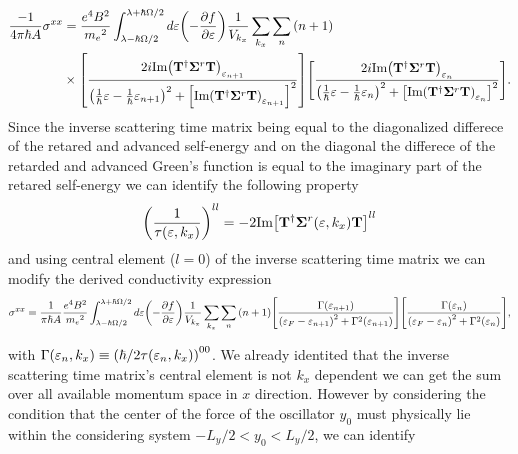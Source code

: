 \begin{widetext}
\begin{equation}
  \begin{aligned}
    \frac{-1}{4\pi\hbar A}
    {\sigma}^{xx} & =
    \frac{e^4B^2}{{{m_e}^2}}
    \int_{\lambda-\hbar\Omega/2}^{\lambda+ \hbar\Omega/2} d\varepsilon
    \qty(
    -\frac{\partial f}{\partial \varepsilon})
    \frac{1}{V_{k_x}} \sum_{k_x} \sum_{n}
    \qty(n+1)
    \\
    & \times
    \qty[
    \frac{2i \text{Im}\qty(\vb{T}^{\dagger} \vb{\Sigma}^r \vb{T})_{\varepsilon_{n+1}}
    }
    {
    \qty(
    \frac{1}{\hbar}\varepsilon -
    \frac{1}{\hbar}\varepsilon_{n+1}
    )^2
    + \qty[\text{Im}\qty(\vb{T}^{\dagger} \vb{\Sigma}^r \vb{T})_{\varepsilon_{n+1}}]^2
    }]
    \qty[
    \frac{2i \text{Im}\qty(\vb{T}^{\dagger} \vb{\Sigma}^r \vb{T})_{\varepsilon_{n}}
    }
    {
    \qty(
    \frac{1}{\hbar}\varepsilon -
    \frac{1}{\hbar}\varepsilon_{n}
    )^2
    + \qty[\text{Im}\qty(\vb{T}^{\dagger} \vb{\Sigma}^r \vb{T})_{\varepsilon_{n}}]^2
    }].
  \end{aligned}
\end{equation}
Since the inverse scattering time matrix being equal to the diagonalized differece of the retared and advanced self-energy and on the diagonal the differece of the retarded and advanced Green's function is equal to the imaginary part of the retared self-energy \cite{wackerl20,wackerlthesis20} we can identify the following property
\begin{equation} \label{eq_29}
  \qty(\frac{1}{\tau(\varepsilon,k_x)})^{ll} =
  -2\text{Im}\qty[ \vb{T}^{\dagger} \vb{\Sigma}^r(\varepsilon,k_x) \vb{T}]^{ll}
\end{equation}
and using central element ($l=0$) of the inverse scattering time matrix we can modify the derived conductivity expression
\begin{equation} \label{eq_30}
    {\sigma}^{xx}   =
    \frac{1}{\pi\hbar A}
    \frac{e^4B^2}{{{m_e}^2}}
    \int_{\lambda-\hbar\Omega/2}^{\lambda+ \hbar\Omega/2} d\varepsilon
    \qty(
    -\frac{\partial f}{\partial \varepsilon})
    \frac{1}{V_{k_x}} \sum_{k_x} \sum_{n}
    \qty(n+1)
    \qty[
    \frac{\Gamma(\varepsilon_{n+1})
    }
    {
    \qty(
    \varepsilon_F - \varepsilon_{n+1}
    )^2
    + \Gamma^2(\varepsilon_{n+1})
    }]
    \qty[
    \frac{\Gamma(\varepsilon_{n})
    }
    {
    \qty(
    \varepsilon_F - \varepsilon_{n}
    )^2
    + \Gamma^2(\varepsilon_{n})
    }],
\end{equation}
\end{widetext}
with $\Gamma(\varepsilon_n,k_x) \equiv \qty({\hbar}/{2\tau(\varepsilon_n,k_x)})^{00}$. We already identited that the inverse scattering time matrix's central element is not $k_x$ dependent we can get the sum over all available momentum space in $x$ direction. However by considering the condition that the center of the force of the oscillator $y_0$ must physically lie within the considering system $-L_y/2 < y_0 < L_y/2$, we can identify
